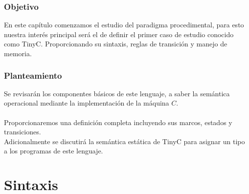 \subsubsection{Objetivo}
En este capítulo comenzamos el estudio del paradigma procedimental, para esto nuestra interés principal será el de definir el primer caso de estudio conocido como \textsf{TinyC}. Proporcionando su sintaxis, reglas de transición y manejo de memoria.

\subsubsection{Planteamiento}
Se revisarán los componentes básicos de este lenguaje, a saber la semántica operacional mediante la implementación de la máquina $C$. \\\\
Proporcionaremos una definición completa incluyendo sus marcos, estados y transiciones.\\
Adicionalmente se discutirá la semántica estática de \textsf{TinyC} para asignar un tipo a los programas de este lenguaje.

\section{Sintaxis}

